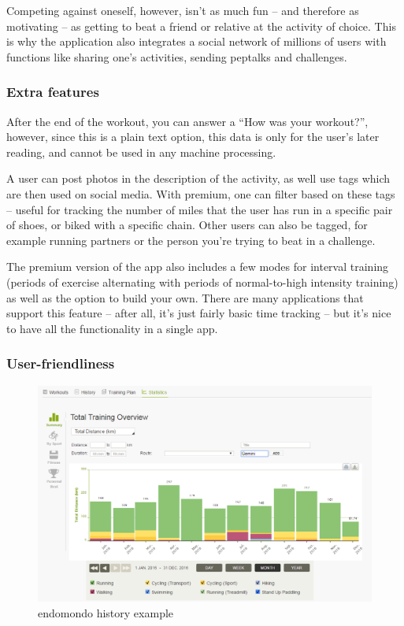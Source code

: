 Competing against oneself, however, isn't as much fun -- and therefore as motivating -- as getting to beat a friend or relative at the activity of choice.
This is why the application also integrates a social network of millions of users with functions like sharing one's activities, sending peptalks and  challenges.
\subsubsection*{Extra features}
After the end of the workout, you can answer a ``How was your workout?'', however, since this is a plain text option, this data is only for the user's later reading, and cannot be used in any machine processing.

A user can post photos in the description of the activity, as well use tags which are then used on social media.
With premium, one can filter based on these tags -- useful for tracking the number of miles that the user has run in a specific pair of shoes, or biked with a specific chain.
Other users can also be tagged, for example running partners or the person you're trying to beat in a challenge.

The premium version of the app also includes a few modes for interval training (periods of exercise alternating with periods of normal-to-high intensity training) as well as the option to build your own.
There are many applications that support this feature -- after all, it's just fairly basic time tracking -- but it's nice to have all the functionality in a single app.
\subsubsection*{User-friendliness}

\begin{figure}[h]
    \includegraphics[width=\textwidth]{Images/endomondo-history-example.png}
    \caption{endomondo history example\cite{endomondo-history-img}}
\end{figure}

